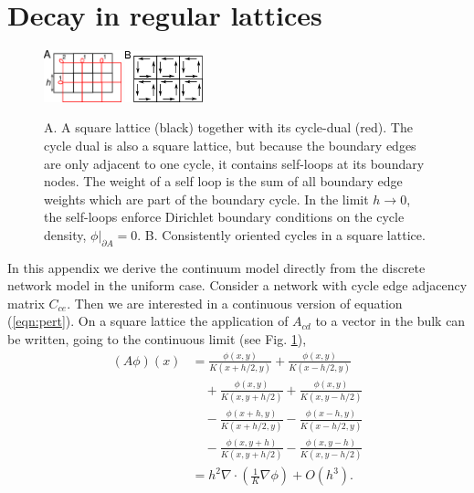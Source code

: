 \documentclass[10pt,aps,pra,twocolumn,superscriptaddress]{revtex4-1}
\begin{document}
\section{Decay in regular lattices}
\label{sec:proof-regular}
\begin{figure}
    \begin{center}
        \includegraphics[width=0.2\textwidth]{pics/DualLattice.pdf} \quad
        \includegraphics[width=0.2\textwidth]{pics/OrientedCycles.pdf}
    \end{center}
    \caption{A. A square lattice (black) together with its cycle-dual
    (red).
    The cycle dual is also a square lattice, but because the boundary
    edges are only adjacent to one cycle, it contains self-loops
    at its boundary nodes. The weight of a self loop is the sum
    of all boundary edge weights which are part of the boundary cycle.
    In the limit $h\rightarrow 0$, the self-loops enforce Dirichlet
    boundary conditions on the cycle density, $\phi|_{\partial A} = 0$.
    B. Consistently oriented cycles in a square lattice.
    \label{fig:cycles-lattice}}
\end{figure}
In this appendix we derive the continuum model directly from the discrete
network model in the uniform case. Consider a network with
cycle edge adjacency matrix $C_{ce}$. Then we are interested in a
continuous version of equation (\ref{eqn:pert}).
On a square lattice the application of $A_{cd}$ to a vector in the 
bulk can be written, going to the continuous limit (see Fig. \ref{fig:cycles-lattice}),
\begin{align}
    (A\phi)(x) &= \frac{\phi(x,y)}{K(x + h/2,y)} 
    +\frac{\phi(x,y)}{K(x - h/2,y)} \\
    &\quad+ \frac{\phi(x,y)}{K(x,y+h/2)}
    + \frac{\phi(x,y)}{K(x,y-h/2)} \\
    &\quad -\frac{\phi(x+h,y)}{K(x+h/2,y)}
    -\frac{\phi(x-h,y)}{K(x-h/2,y)} \\
    &\quad-\frac{\phi(x,y+h)}{K(x,y+h/2)}
    -\frac{\phi(x,y-h)}{K(x,y-h/2)} \\
    &= h^2 \nabla \cdot \left(\frac{1}{K} \nabla \phi\right) + O(h^3).
\end{align}
\end{document}
